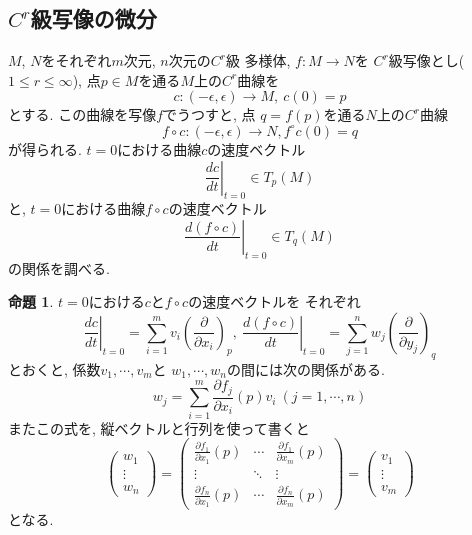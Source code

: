 \documentclass[a4j,12pt]{jarticle}
\theoremstyle{definition}
\newtheorem{proposition}[theorem]{命題}
\begin{document}
\subsection{$C^r$級写像の微分}
$M$, $N$をそれぞれ$m$次元, $n$次元の$C^r$級
多様体, $f:M\to N$を
$C^r$級写像とし($1 \leq r\leq \infty$), 
点$p\in M$を通る$M$上の$C^r$曲線を
$$c:(-\epsilon, \epsilon)\to M,\ c(0)=p$$
とする. この曲線を写像$f$でうつすと, 点
$q=f(p)$を通る$N$上の$C^r$曲線
$$f\circ c:(-\epsilon, \epsilon)\to N, f^\circ c(0)=q$$
が得られる. 
$t=0$における曲線$c$の速度ベクトル
$$\left .\frac{dc}{dt}\right|_{t=0}\in T_p(M)$$
と, $t=0$における曲線$f\circ c$の速度ベクトル
$$\left .\frac{d(f\circ c)}{dt}\right|_{t=0}
\in T_q(M)$$
の関係を調べる. 
\begin{proposition}\label{prop:relation of v and w}
    $t=0$における$c$と$f\circ c$の速度ベクトルを
    それぞれ
    $$\left .\frac{dc}{dt}\right|_{t=0}=
    \sum_{i=1}^{m}v_i\left(\frac{\partial}
    {\partial x_i}\right)_p,\ 
    \left .\frac{d(f\circ c)}{dt}\right|_{t=0}=
    \sum_{j=1}^{n}w_j\left(\frac{\partial}
    {\partial y_j}\right)_q$$
    とおくと, 係数$v_1,\cdots ,v_m$と
    $w_1,\cdots ,w_n$の間には次の関係がある. 
    $$w_j=\sum_{i=1}^{m}\frac{\partial f_j}
    {\partial x_i}(p)v_i\ (j=1,\cdots ,n)$$
    またこの式を, 縦ベクトルと行列を使って書くと
    $$\begin{pmatrix}
          w_1 \\
          \vdots \\
          w_n 
        \end{pmatrix}
        =
        \left(
        \begin{array}{ccc}
          \frac{\partial f_1}{\partial x_1}(p)&\cdots &\frac{\partial f_1}{\partial x_m}(p)\\
          \vdots &\ddots& \vdots \\
          \frac{\partial f_n}{\partial x_1}(p)&\cdots &\frac{\partial f_n}{\partial x_m}(p) 
        \end{array} 
        \right)=
        \begin{pmatrix}
          v_1\\
          \vdots \\
          v_m
        \end{pmatrix}
        $$
    となる. 
\end{proposition}
\end{document}

